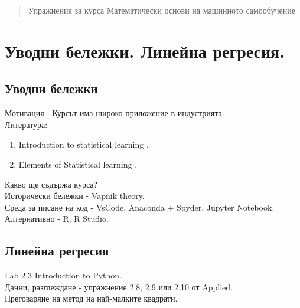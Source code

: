 \documentclass{article}
\begin{document}
	\newpage
	\date{}
	\maketitle

	\begin{abstract}
		Упражнения за курса Математически основи на машинното самообучение
	\end{abstract}
	
	\tableofcontents
		


	\section{Уводни бележки. Линейна регресия.}
	\subsection{Уводни бележки}
	Мотивация - Курсът има широко приложение в индустрията.\\	
	Литература:
	\begin{enumerate}
	\item  Introduction to statistical learning \cite{james2023introduction}.
	\item  Elements of Statistical learning  \cite{hastie01statisticallearning}.
	\end{enumerate}
	
	\noindent
	Какво ще съдържа курса? \\
	
	\noindent
	Исторически бележки - Vapnik theory. \\

	\noindent	
	Среда за писане на код - VsCode, Anaconda + Spyder, Jupyter Notebook. \\
 	Алтернативно - R, R Studio.
	\subsection{Линейна регресия}
	Lab 2.3 Introduction to Python. \\
	Данни, разглеждане - упражнение 2.8, 2.9 или 2.10 от Applied. \\
	
	Преговаряне на метод на най-малките квадрати.
	
\end{document}
